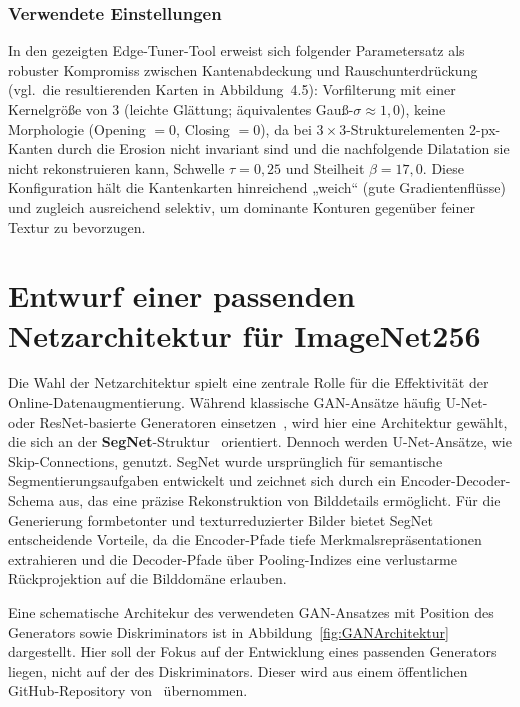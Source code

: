 {\newpage

\subsubsection{Verwendete Einstellungen}
In den gezeigten Edge-Tuner-Tool erweist sich folgender Parametersatz als robuster Kompromiss zwischen Kantenabdeckung und Rauschunterdrückung (vgl.\ die resultierenden Karten in Abbildung~4.5): Vorfilterung mit einer Kernelgröße von 3 (leichte Glättung; äquivalentes Gauß-\(\sigma \approx 1{,}0\)), keine Morphologie (Opening \(= 0\), Closing \(= 0\)), da bei \(3\times 3\)-Strukturelementen 2-px-Kanten durch die Erosion nicht invariant sind und die nachfolgende Dilatation sie nicht rekonstruieren kann, Schwelle \(\tau = 0{,}25\) und Steilheit \(\beta = 17{,}0\). Diese Konfiguration hält die Kantenkarten hinreichend „weich“ (gute Gradientenflüsse) und zugleich ausreichend selektiv, um dominante Konturen gegenüber feiner Textur zu bevorzugen.






\section{Entwurf einer passenden Netzarchitektur für ImageNet256}
\label{sec:AnpassungNetzarchtektur_ImageNet256}
Die Wahl der Netzarchitektur spielt eine zentrale Rolle für die Effektivität der Online-Datenaugmentierung. 
Während klassische \ac{GAN}-Ansätze häufig U-Net- oder ResNet-basierte Generatoren einsetzen~\cite{ronneberger2015unet, isola2018Pix2Pix}, wird hier eine Architektur gewählt, die sich an der \textbf{SegNet}-Struktur~\cite{badrinarayanan2017segnet} orientiert.
Dennoch werden U-Net-Ansätze, wie Skip-Connections, genutzt.
SegNet wurde ursprünglich für semantische Segmentierungsaufgaben entwickelt und zeichnet sich durch ein Encoder-Decoder-Schema aus, das eine präzise Rekonstruktion von Bilddetails ermöglicht. 
Für die Generierung formbetonter und texturreduzierter Bilder bietet SegNet entscheidende Vorteile, da die Encoder-Pfade tiefe Merkmalsrepräsentationen extrahieren und die Decoder-Pfade über Pooling-Indizes eine verlustarme Rückprojektion auf die Bilddomäne erlauben.

Eine schematische Architekur des verwendeten \ac{GAN}-Ansatzes mit Position des Generators sowie Diskriminators ist in Abbildung~\ref{fig:GANArchitektur} dargestellt. Hier soll der Fokus auf der Entwicklung eines passenden Generators liegen, nicht auf der des Diskriminators. Dieser wird aus einem öffentlichen GitHub-Repository von~\textcite{conotsilly_iccv23_edge_2025} übernommen.

}

